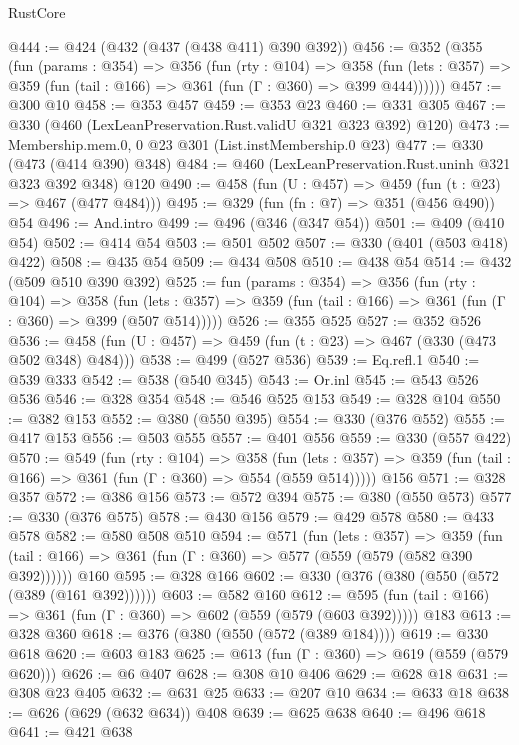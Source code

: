 \begin{lexlean}{RustCore}
\begin{coremodule}
@444 := @424 (@432 (@437 (@438 @411) @390 @392))
@456 := @352
    (@355
      (fun (params : @354) =>
      @356
        (fun (rty : @104) =>
        @358
          (fun (lets : @357) => @359 (fun (tail : @166) => @361 (fun (Γ : @360) => @399 @444))))))
@457 := @300 @10
@458 := @353 @457
@459 := @353 @23
@460 := @331 @305
@467 := @330 (@460 (LexLeanPreservation.Rust.validU @321 @323 @392) @120)
@473 := Membership.mem.{0, 0} @23 @301 (List.instMembership.{0} @23)
@477 := @330 (@473 (@414 @390) @348)
@484 := @460 (LexLeanPreservation.Rust.uninh @321 @323 @392 @348) @120
@490 := @458 (fun (U : @457) => @459 (fun (t : @23) => @467 (@477 @484)))
@495 := @329 (fun (fn : @7) => @351 (@456 @490)) @54
@496 := And.intro
@499 := @496 (@346 (@347 @54))
@501 := @409 (@410 @54)
@502 := @414 @54
@503 := @501 @502
@507 := @330 (@401 (@503 @418) @422)
@508 := @435 @54
@509 := @434 @508
@510 := @438 @54
@514 := @432 (@509 @510 @390 @392)
@525 := fun (params : @354) =>
  @356
    (fun (rty : @104) =>
    @358
      (fun (lets : @357) => @359 (fun (tail : @166) => @361 (fun (Γ : @360) => @399 (@507 @514)))))
@526 := @355 @525
@527 := @352 @526
@536 := @458 (fun (U : @457) => @459 (fun (t : @23) => @467 (@330 (@473 @502 @348) @484)))
@538 := @499 (@527 @536)
@539 := Eq.refl.{1}
@540 := @539 @333
@542 := @538 (@540 @345)
@543 := Or.inl
@545 := @543 @526 @536
@546 := @328 @354
@548 := @546 @525 @153
@549 := @328 @104
@550 := @382 @153
@552 := @380 (@550 @395)
@554 := @330 (@376 @552)
@555 := @417 @153
@556 := @503 @555
@557 := @401 @556
@559 := @330 (@557 @422)
@570 := @549
    (fun (rty : @104) =>
    @358
      (fun (lets : @357) => @359 (fun (tail : @166) => @361 (fun (Γ : @360) => @554 (@559 @514)))))
    @156
@571 := @328 @357
@572 := @386 @156
@573 := @572 @394
@575 := @380 (@550 @573)
@577 := @330 (@376 @575)
@578 := @430 @156
@579 := @429 @578
@580 := @433 @578
@582 := @580 @508 @510
@594 := @571
    (fun (lets : @357) =>
    @359 (fun (tail : @166) => @361 (fun (Γ : @360) => @577 (@559 (@579 (@582 @390 @392))))))
    @160
@595 := @328 @166
@602 := @330 (@376 (@380 (@550 (@572 (@389 (@161 @392))))))
@603 := @582 @160
@612 := @595 (fun (tail : @166) => @361 (fun (Γ : @360) => @602 (@559 (@579 (@603 @392))))) @183
@613 := @328 @360
@618 := @376 (@380 (@550 (@572 (@389 @184))))
@619 := @330 @618
@620 := @603 @183
@625 := @613 (fun (Γ : @360) => @619 (@559 (@579 @620)))
@626 := @6 @407
@628 := @308 @10 @406
@629 := @628 @18
@631 := @308 @23 @405
@632 := @631 @25
@633 := @207 @10
@634 := @633 @18
@638 := @626 (@629 (@632 @634)) @408
@639 := @625 @638
@640 := @496 @618
@641 := @421 @638

\end{coremodule}
\end{lexlean}
